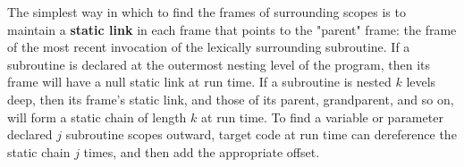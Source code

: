 \vskip 6pt
The simplest way in which to find the frames of surrounding scopes is to maintain a {\bf static link} in each frame that points to the "parent" frame: the frame of the most recent invocation of the lexically surrounding subroutine. If a subroutine is declared at the outermost nesting level of the program, then its frame will have a null static link at run time. If a subroutine is nested $k$ levels deep, then its frame's static link, and those of its parent, grandparent, and so on, will form a static chain of length $k$ at run time. To find a variable or parameter declared $j$ subroutine scopes outward, target code at run time can dereference the static chain $j$ times, and then add the appropriate offset.


\vfill\eject
\bye
